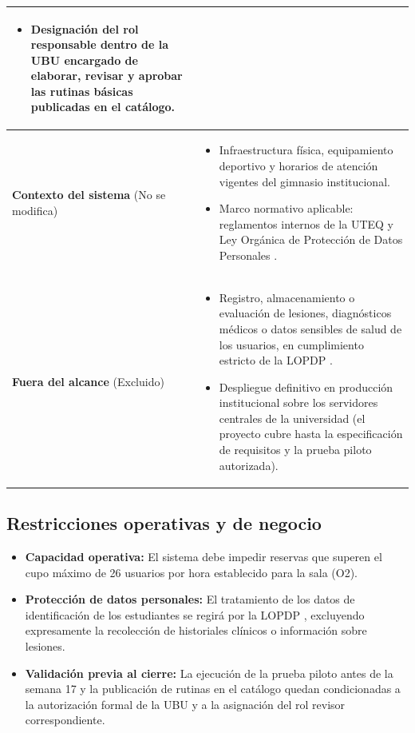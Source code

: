 \begin{table}[htbp]
\begin{tabular}{p{3.6cm} p{10.4cm}}
\begin{itemize}[leftmargin=*, nosep, after=\vspace{2pt}]
    \item Designación del rol responsable dentro de la UBU encargado de elaborar, revisar y aprobar las rutinas básicas publicadas en el catálogo.
\end{itemize} \\
\hline
\textbf{Contexto del sistema} \newline (No se modifica) &
\begin{itemize}[leftmargin=*, nosep, after=\vspace{2pt}]
    \item Infraestructura física, equipamiento deportivo y horarios de atención vigentes del gimnasio institucional.
    \item Marco normativo aplicable: reglamentos internos de la UTEQ y Ley Orgánica de Protección de Datos Personales \cite{lopdp2021}.
\end{itemize} \\
\hline
\textbf{Fuera del alcance} \newline (Excluido) &
\begin{itemize}[leftmargin=*, nosep, after=\vspace{2pt}]
    \item Registro, almacenamiento o evaluación de lesiones, diagnósticos médicos o datos sensibles de salud de los usuarios, en cumplimiento estricto de la LOPDP \cite{lopdp2021}.
    \item Despliegue definitivo en producción institucional sobre los servidores centrales de la universidad (el proyecto cubre hasta la especificación de requisitos y la prueba piloto autorizada).
\end{itemize} \\
\hline
\end{tabular}
\end{table}

\subsection{Restricciones operativas y de negocio}
\begin{itemize}
    \item \textbf{Capacidad operativa:} El sistema debe impedir reservas que superen el cupo máximo de 26 usuarios por hora establecido para la sala (O2).
    \item \textbf{Protección de datos personales:} El tratamiento de los datos de identificación de los estudiantes se regirá por la LOPDP \cite{lopdp2021}, excluyendo expresamente la recolección de historiales clínicos o información sobre lesiones.
    \item \textbf{Validación previa al cierre:} La ejecución de la prueba piloto antes de la semana 17 y la publicación de rutinas en el catálogo quedan condicionadas a la autorización formal de la UBU y a la asignación del rol revisor correspondiente.
\end{itemize}
